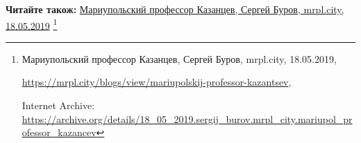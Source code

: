  
 
 
 
 

\def\pubIA{https://archive.org/details/18_05_2019.sergij_burov.mrpl_city.mariupol_professor_kazancev}
\def\pubTitle{Мариупольский профессор Казанцев}
\def\pubDate{18.05.2019}
\def\pubOrigin{https://mrpl.city/blogs/view/mariupolskij-professor-kazantsev}
\def\pubAuthor{Сергей Буров}

\textbf{Читайте також:} \href{\pubIA}{%
\pubTitle, \pubAuthor, mrpl.city, \pubDate}%
\footnote{\pubTitle, \pubAuthor, mrpl.city, \pubDate, \par\url{\pubOrigin}, \par Internet Archive: \url{\pubIA}}
